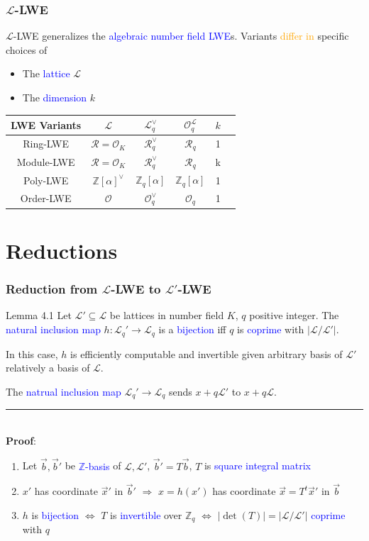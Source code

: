 \documentclass{beamer}
\newcommand{\blue}[1]{\textcolor{blue}{#1}}
\newcommand{\dgreen}[1]{\textcolor{dgreen}{#1}}
\newcommand{\orange}[1]{\textcolor{orange}{#1}}
\newcommand{\cL}{\mathcal{L}}
\newcommand{\cO}{\mathcal{O}}
\newcommand{\cR}{\mathcal{R}}
\newcommand{\bbZ}{\mathbb{Z}}
\newcommand{\cOL}{\mathcal{O}^{\mathcal{L}}}
\newcommand{\cLV}{\mathcal{L}^{\vee}}
\newcommand{\vb}{\vec{b}}
\newcommand{\vx}{\vec{x}}
\newcommand{\divline}{\noindent\rule{6cm}{0.4pt}}
\begin{document}
\frame
{
  \frametitle{$\cL$-LWE}

  $\cL$-LWE generalizes the \blue{algebraic number field LWE}s.
  Variants \orange{differ in} specific choices of
  \begin{itemize}
  	\item The \blue{lattice} $\cL$
  	\item The \blue{dimension} $k$
  \end{itemize}

  \begin{table}[tb]
  	\centering

  	\begin{tabular}{c|ccccc}
  	\hline

  	\hline
  	\textbf{LWE Variants} & $\cL$ & $\cLV_q$ & $\cOL_q$ & $k$ \\
  	\hline
  		Ring-LWE & $\cR=\cO_K$ & $\cR_q^{\vee}$ & $\cR_q$ & 1 \\
  		Module-LWE & $\cR=\cO_K$ & $\cR_q^{\vee}$ & $\cR_q$ & k \\
  		Poly-LWE & $\bbZ[\alpha]^{\vee}$ & $\bbZ_q[\alpha]$ & $\bbZ_q[\alpha]$ & 1 \\
  		Order-LWE & $\cO$ & $\cO_q^{\vee}$ & $\cO_q$ & 1 \\
  	\hline

  	\hline
  	\end{tabular}
  \end{table}
}

\section{Reductions}
\frame
{
  \frametitle{Reduction from $\cL$-LWE to $\cL'$-LWE}

  \begin{block}{Lemma 4.1}
  Let $\cL'\subseteq\cL$ be lattices in number field $K$, $q$ positive integer.
  The \blue{natural inclusion map} $h:\cL_q'\to\cL_q$ is a \blue{bijection} iff $q$ is \blue{coprime} with $|\cL/\cL'|$.

  In this case, $h$ is \dgreen{efficiently computable and invertible} given arbitrary basis of $\cL'$ relatively a basis of $\cL$.
  \end{block}

  The \blue{natrual inclusion map} $\cL_q'\to\cL_q$ sends $x+q\cL'$ to $x+q\cL$.

  \divline\\

  \textbf{Proof}:
  \begin{enumerate}
  	\item Let $\vb,\vb'$ be \blue{$\bbZ$-basis} of $\cL,\cL'$, $\vb'=T\vb$, $T$ is \blue{square integral matrix}
  	\item $x'$ has coordinate $\vx'$ in $\vb'$ $\Rightarrow$ $x=h(x')$ has coordinate $\vx=T^t\vx'$ in $\vb$
  	\item $h$ is \blue{bijection} $\Leftrightarrow$ $T$ is \blue{invertible} over $\bbZ_q$ $\Leftrightarrow$ $|\det(T)|=|\cL/\cL'|$ \blue{coprime} with $q$
  \end{enumerate}
}
\end{document}
